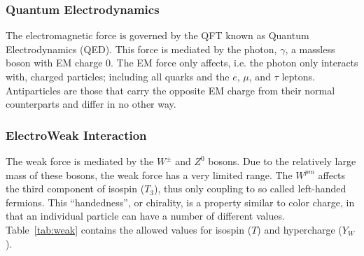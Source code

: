 		\subsubsection{Quantum Electrodynamics}\label{sssec:QED}

		The electromagnetic force is governed by the QFT known as Quantum Electrodynamics (QED). This force is mediated by the photon, $\gamma$, a massless boson with EM charge 0. The EM force only affects, i.e. the photon only interacts with, charged particles; including all quarks and the $e$, $\mu$, and $\tau$ leptons. Antiparticles are those that carry the opposite EM charge from their normal counterparts and differ in no other way.

		\subsubsection{ElectroWeak Interaction}\label{sssec:ElectroWeak}

		The weak force is mediated by the $W^{\pm}$ and $Z^0$ bosons. Due to the relatively large mass of these bosons, the weak force has a very limited range. The $W^{pm}$ affects the third component of isospin ($T_3$), thus only coupling to so called left-handed fermions. This ``handedness'', or chirality, is a property similar to color charge, in that an individual particle can have a number of different values. Table~\ref{tab:weak} contains the allowed values for isospin ($T$) and hypercharge ($Y_W$). 

